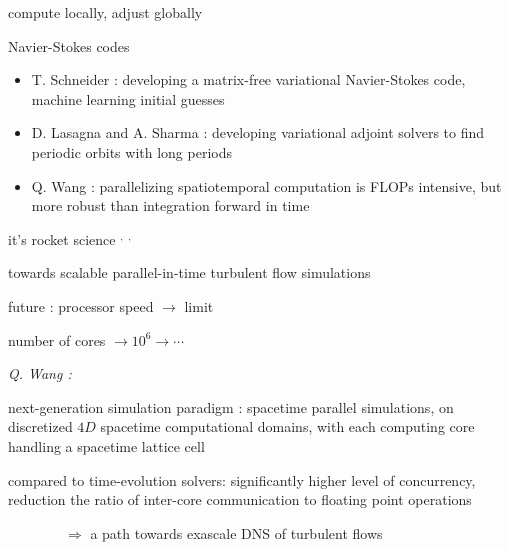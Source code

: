 \begin{frame}{compute locally, adjust globally}
\begin{block}{Navier-Stokes codes}
\begin{itemize}
 \item
T. Schneider : developing a matrix-free variational Navier-Stokes code,
machine learning initial guesses
 \item
D. Lasagna and A. Sharma  : developing variational adjoint solvers to
find periodic orbits with long periods
 \item
Q. Wang : parallelizing {\color{red}spatiotemporal}
computation is FLOPs intensive, but more robust than
integration forward in time
\end{itemize}
\end{block}

\vfill\hfill
it's rocket science%
$^,$%
$^,$%
\end{frame}

\begin{frame}{
towards scalable parallel-in-time turbulent flow simulations
}
\begin{block}{future :}%
processor speed $\to$ limit

\medskip

number of cores $\to 10^6 \to \cdots$

\medskip
\end{block}

\emph{Q. Wang%
    :} %

next-generation simulation paradigm : spacetime parallel
simulations, on discretized $4D$ spacetime
computational domains, with each computing core handling a spacetime lattice cell

\bigskip

compared to time-evolution solvers:
significantly higher level of concurrency, reduction the ratio of
inter-core communication to floating point operations

\bigskip

$\qquad\qquad\Rightarrow$ a path towards exascale DNS of turbulent flows
\end{frame}


